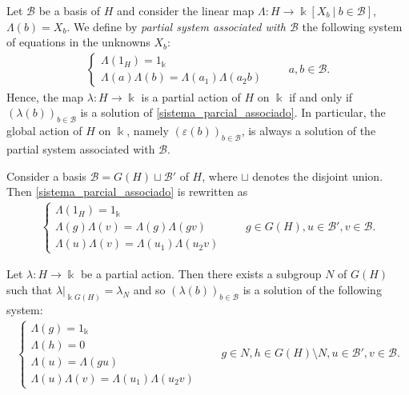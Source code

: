 \documentclass[reqno]{amsart}
\theoremstyle{definition}
\numberwithin{equation}{section}\theoremstyle{plain}
\newcommand{\B}{\mathcal{B}}
\theoremstyle{definition}
\def \k {\Bbbk}
\begin{document}
\medbreak

Let $\mathcal{B}$ be a basis of $H$ and consider the linear map $\Lambda: H \longrightarrow \k [ X_b \ | \ b \in \B ]$, $\Lambda(b) = X_b$.
	We define by \emph{partial system associated with $\B$} the following system of equations in the unknowns \(X_b\):
\begin{align}\label{sistema_parcial_associado}
	\left\{ \begin{array}{ll}\Lambda(1_H) = 1_\k \\
		\Lambda(a)\Lambda(b)= \Lambda(a_1)\Lambda(a_2 b)  \end{array}\right. \qquad a, b \in \B.
\end{align}
Hence, the map $\lambda : H \longrightarrow \k$ is a partial action of $H$ on $\k$ if and only if $(\lambda(b))_{b \in \B}$ is a solution of \eqref{sistema_parcial_associado}.
In particular, the global action of $H$ on $\k$, namely $(\varepsilon(b))_{b \in \B}$, is always a solution of the partial system associated with $\B$.

\medbreak

Consider a basis $\B = G(H) \sqcup \B'$ of $H$, where $\sqcup$ denotes the disjoint union.
Then \eqref{sistema_parcial_associado} is rewritten as
\begin{align*}
\left\{\begin{array}{ll} \Lambda(1_H)= 1_\k \\
\Lambda(g)\Lambda(v)= \Lambda(g)\Lambda(g v) \\
\Lambda(u)\Lambda(v)= \Lambda({u}_1)\Lambda({u}_2 v) \end{array}\right. \qquad g \in G(H), u \in \B', v \in \B.
\end{align*}

Let $\lambda:H \longrightarrow \k$ be a partial action.
Then there exists a subgroup $N$ of $G(H)$ such that $\lambda |_{\k G(H)} = \lambda_N$ and so $(\lambda(b))_{b \in \B}$ is a solution of the following system:
\begin{align}\label{sistema_condicao_inicial}
\left\{\begin{array}{ll} \Lambda(g) = 1_\k \\
\Lambda(h) = 0 \\
\Lambda(u) = \Lambda(g u) \\
\Lambda(u)\Lambda(v)= \Lambda({u}_1)\Lambda({u}_2 v) \end{array}\right. \qquad g \in N, h \in G(H) \setminus N, u \in \B', v \in \B.
\end{align}
\end{document}
